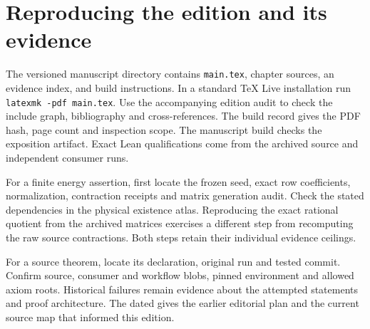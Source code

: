 \section{Reproducing the edition and its evidence}
The versioned manuscript directory contains \texttt{main.tex}, chapter sources, an evidence index, and build instructions. In a standard TeX Live installation run \texttt{latexmk -pdf main.tex}. Use the accompanying edition audit to check the include graph, bibliography and cross-references. The build record gives the PDF hash, page count and inspection scope. The manuscript build checks the exposition artifact. Exact Lean qualifications come from the archived source and independent consumer runs.

For a finite energy assertion, first locate the frozen seed, exact row coefficients, normalization, contraction receipts and matrix generation audit. Check the stated dependencies in the physical existence atlas. Reproducing the exact rational quotient from the archived matrices exercises a different step from recomputing the raw source contractions. Both steps retain their individual evidence ceilings.

For a source theorem, locate its declaration, original run and tested commit. Confirm source, consumer and workflow blobs, pinned environment and allowed axiom roots. Historical failures remain evidence about the attempted statements and proof architecture. The dated  gives the earlier editorial plan and the current source map that informed this edition.
